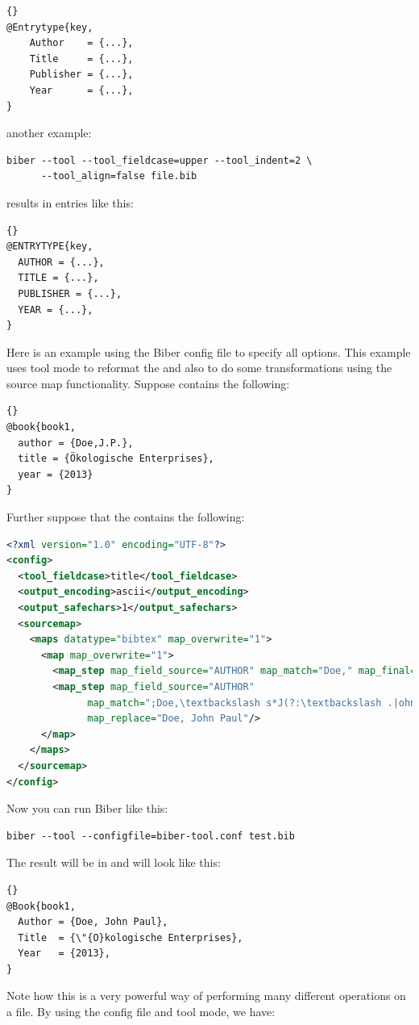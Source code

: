 \documentclass{ltxdockit}
\newcommand*{\biber}{Biber\xspace}
\begin{document}
\begin{lstlisting}[style=bibtex, columns=fixed]{}
@Entrytype{key,
    Author    = {...},
    Title     = {...},
    Publisher = {...},
    Year      = {...},
}
\end{lstlisting}
%
another example:
\begin{verbatim}
biber --tool --tool_fieldcase=upper --tool_indent=2 \
      --tool_align=false file.bib
\end{verbatim}
%
results in entries like this:

\begin{lstlisting}[style=bibtex]{}
@ENTRYTYPE{key,
  AUTHOR = {...},
  TITLE = {...},
  PUBLISHER = {...},
  YEAR = {...},
}
\end{lstlisting}
%
Here is an example using the \biber config file to specify all options.
This example uses tool mode to reformat the \file{.bib} and also to do some
transformations using the source map functionality. Suppose
 contains the following:

\begin{lstlisting}[style=bibtex]{}
@book{book1,
  author = {Doe,J.P.},
  title = {Ökologische Enterprises},
  year = {2013}
}
\end{lstlisting}
%
Further suppose that the  contains the following:

\begin{lstlisting}[language=xml,escapechar=;,mathescape=true]
<?xml version="1.0" encoding="UTF-8"?>
<config>
  <tool_fieldcase>title</tool_fieldcase>
  <output_encoding>ascii</output_encoding>
  <output_safechars>1</output_safechars>
  <sourcemap>
    <maps datatype="bibtex" map_overwrite="1">
      <map map_overwrite="1">
        <map_step map_field_source="AUTHOR" map_match="Doe," map_final="1"/>
        <map_step map_field_source="AUTHOR"
              map_match=";Doe,\textbackslash s*J(?:\textbackslash .|ohn)(?:[-]*)(?:P\textbackslash .|Paul)*;"
              map_replace="Doe, John Paul"/>
      </map>
    </maps>
  </sourcemap>
</config>
\end{lstlisting}
%
Now you can run \biber like this:

\begin{verbatim}
biber --tool --configfile=biber-tool.conf test.bib
\end{verbatim}
%
The result will be in  and will look like this:

\begin{lstlisting}[style=bibtex, columns=fixed]{}
@Book{book1,
  Author = {Doe, John Paul},
  Title  = {\"{O}kologische Enterprises},
  Year   = {2013},
}
\end{lstlisting}
%
Note how this is a very powerful way of performing many different
operations on a \file{.bib} file. By using the config file and tool mode, we have:
\end{document}

